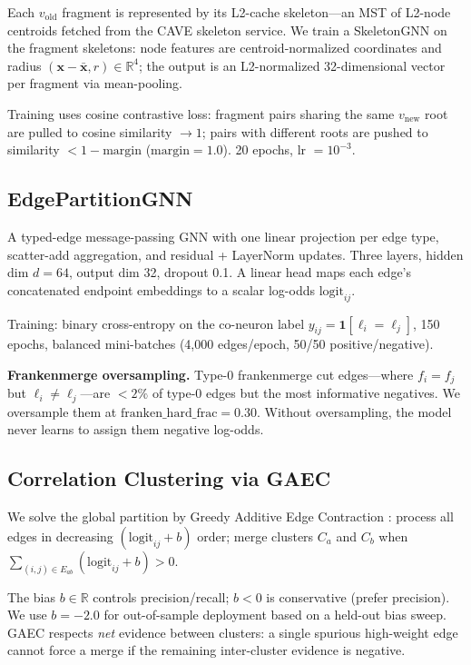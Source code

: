 \documentclass[10pt,letterpaper]{article}
\begin{document}
Each $v_\text{old}$ fragment is represented by its L2-cache skeleton---an MST of L2-node
centroids fetched from the CAVE skeleton service. We train a SkeletonGNN on the fragment
skeletons: node features are centroid-normalized coordinates and radius
$(\mathbf{x} - \bar{\mathbf{x}}, r) \in \mathbb{R}^4$; the output is an L2-normalized
32-dimensional vector per fragment via mean-pooling.

Training uses cosine contrastive loss: fragment pairs sharing the same $v_\text{new}$ root
are pulled to cosine similarity $\to 1$; pairs with different roots are pushed to
similarity $< 1 - \mathrm{margin}$ ($\mathrm{margin} = 1.0$). 20 epochs, lr $= 10^{-3}$.

\subsection{EdgePartitionGNN}

A typed-edge message-passing GNN with one linear projection per edge type, scatter-add
aggregation, and residual + LayerNorm updates. Three layers, hidden dim $d = 64$, output
dim 32, dropout 0.1. A linear head maps each edge's concatenated endpoint embeddings to
a scalar log-odds $\mathrm{logit}_{ij}$.

Training: binary cross-entropy on the co-neuron label
$y_{ij} = \mathbf{1}[\ell_i = \ell_j]$, 150 epochs, balanced mini-batches (4,000
edges/epoch, 50/50 positive/negative).

\textbf{Frankenmerge oversampling.} Type-0 frankenmerge cut edges---where $f_i = f_j$ but
$\ell_i \neq \ell_j$---are $<2\%$ of type-0 edges but the most informative negatives.
We oversample them at $\mathrm{franken\_hard\_frac} = 0.30$. Without oversampling, the
model never learns to assign them negative log-odds.

\subsection{Correlation Clustering via GAEC}

We solve the global partition by Greedy Additive Edge Contraction \cite{keuper2015multicuts}:
process all edges in decreasing $(\mathrm{logit}_{ij} + b)$ order; merge clusters $C_a$
and $C_b$ when $\sum_{(i,j) \in E_{ab}} (\mathrm{logit}_{ij} + b) > 0$.

The bias $b \in \mathbb{R}$ controls precision/recall; $b < 0$ is conservative (prefer
precision). We use $b = -2.0$ for out-of-sample deployment based on a held-out bias sweep.
GAEC respects \emph{net} evidence between clusters: a single spurious high-weight edge
cannot force a merge if the remaining inter-cluster evidence is negative.
\end{document}

